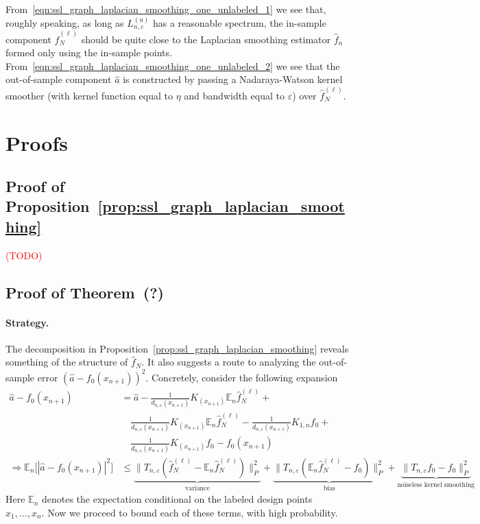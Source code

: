 \documentclass{article}
\newcommand{\1}{\mathbf{1}}
\newcommand{\Ebb}{\mathbb{E}}
\newcommand{\wh}[1]{\widehat{#1}}
\theoremstyle{alden}
\theoremstyle{aldenthm}
\theoremstyle{definition}
\theoremstyle{remark}
\begin{document}
From~\eqref{eqn:ssl_graph_laplacian_smoothing_one_unlabeled_1} we see that, roughly speaking, as long as $L_{n,\varepsilon}^{(u)}$ has a reasonable spectrum, the in-sample component $\wh{f}_N^{(\ell)}$ should be quite close to the Laplacian smoothing estimator $\wh{f}_n$ formed only using the in-sample points. From~\eqref{eqn:ssl_graph_laplacian_smoothing_one_unlabeled_2} we see that the out-of-sample component $\wh{a}$ is constructed by passing a Nadaraya-Watson kernel smoother (with kernel function equal to $\eta$ and bandwidth equal to $\varepsilon$) over $\wh{f}_N^{(\ell)}$.



\section{Proofs}

\subsection{Proof of Proposition~\ref{prop:ssl_graph_laplacian_smoothing}}
\label{subsec:pf_ssl_graph_laplacian_smoothing}
\textcolor{red}{(TODO)}

\subsection{Proof of Theorem~{(?)}}
\label{subsec:pf_ssl_graph_laplacian_smoothing_2}

\paragraph{Strategy.}
The decomposition in Proposition~\ref{prop:ssl_graph_laplacian_smoothing} reveals something of the structure of $\wh{f}_N$. It also suggests a route to analyzing the out-of-sample error $(\wh{a} - f_0(x_{n + 1}))^2$. Concretely, consider the following expansion
\begin{align*}
\wh{a} - f_0(x_{n + 1}) & = \wh{a} - \frac{1}{d_{n,\varepsilon}(x_{n + 1})}K_{(x_{n + 1})} \Ebb_n\wh{f}_N^{(\ell)} + \\
& \quad \frac{1}{d_{n,\varepsilon}(x_{n + 1})}K_{(x_{n + 1})} \Ebb_n\wh{f}_N^{(\ell)} - \frac{1}{d_{n,\varepsilon}(x_{n + 1})}K_{1,n} f_0 + \\
& \quad \frac{1}{d_{n,\varepsilon}(x_{n + 1})}K_{(x_{n + 1})} f_0 - f_0(x_{n + 1}) \\
\Longrightarrow \Ebb_n\bigl[|\wh{a} - f_0(x_{n + 1})|^2\bigr]& \leq \underbrace{\|T_{n,\varepsilon}(\wh{f}_N^{(\ell)} - \mathbb{E}_{n}\wh{f}_N^{(\ell)})\|_P^2}_{\textrm{variance}} + \underbrace{\|T_{n,\varepsilon}(\mathbb{E}_{n}\wh{f}_N^{(\ell)} - f_0)\|_P^2}_{\textrm{bias}} + \underbrace{\|T_{n,\varepsilon}f_0 - f_0\|_P^2}_{\textrm{noiseless kernel smoothing}}
\end{align*}
Here $\Ebb_n$ denotes the expectation conditional on the labeled design points $x_1,\ldots,x_n$. Now we proceed to bound each of these terms, with high probability.
\end{document}
